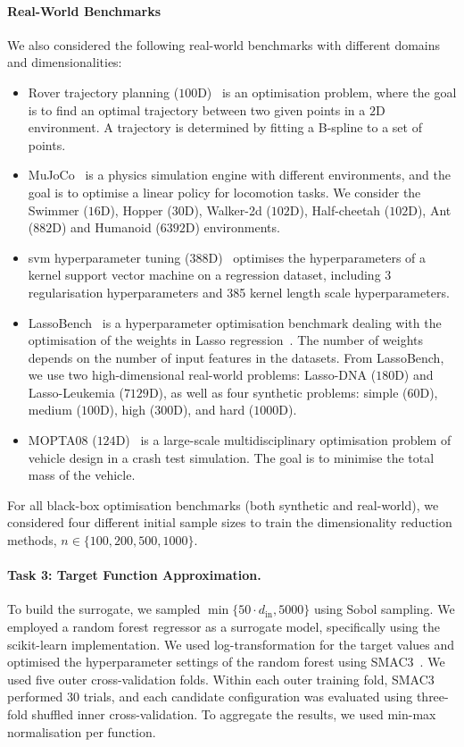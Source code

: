 \paragraph*{Real-World Benchmarks}
We also considered the following real-world benchmarks with different domains and dimensionalities:
\begin{itemize}
    \item Rover trajectory planning ($100\mathrm{D}$)~\citep{WanEtAl18} is an optimisation problem, where the goal is to find an optimal trajectory between two given points in a $2\mathrm{D}$ environment. A trajectory is determined by fitting a B-spline to a set of points.
    \item MuJoCo~\citep{ManEtAl18,TodEtAl12} is a physics simulation engine with different environments, and the goal is to optimise a linear policy for locomotion tasks. We consider the Swimmer ($16\mathrm{D}$), Hopper ($30\mathrm{D}$), Walker-2d ($102\mathrm{D}$), Half-cheetah ($102\mathrm{D}$), Ant ($882\mathrm{D}$) and Humanoid ($6392\mathrm{D}$) environments.
    \item \gls{svm} hyperparameter tuning ($388\mathrm{D}$)~\citep{EriJan21} optimises the hyperparameters of a kernel support vector machine on a regression dataset, including 3 regularisation hyperparameters and 385 kernel length scale hyperparameters.
    \item LassoBench~\citep{SehEtAl22} is a hyperparameter optimisation benchmark dealing with the optimisation of the weights in Lasso regression~\cite{GasEtAl09}. The number of weights depends on the number of input features in the datasets. From LassoBench, we use two high-dimensional real-world problems: Lasso-DNA ($180\mathrm{D}$) and Lasso-Leukemia ($7129\mathrm{D}$), as well as four synthetic problems: simple ($60\mathrm{D}$), medium ($100\mathrm{D}$), high ($300\mathrm{D}$), and hard ($1000\mathrm{D}$).
    \item MOPTA08 ($124\mathrm{D}$)~\citep{Jones08,EriJan21} is a large-scale multidisciplinary optimisation problem of vehicle design in a crash test simulation. The goal is to minimise the total mass of the vehicle.
\end{itemize}

For all black-box optimisation benchmarks (both synthetic and real-world), we considered four different initial sample sizes to train the dimensionality reduction methods, $n \in \{100,200,500,1000 \}$.
\paragraph*{Task 3: Target Function Approximation.}
To build the surrogate, we sampled $\min\{50 \cdot d_{\mathrm{in}}, 5000\}$ using Sobol sampling.
We employed a random forest regressor as a surrogate model, specifically using the scikit-learn implementation.
We used log-transformation for the target values and optimised
the hyperparameter settings of the random forest using SMAC3~\citep{LinEtAl22b}.
We used five outer cross-validation folds. Within each outer training fold, SMAC3 performed 30 trials, and each candidate configuration was evaluated using three-fold shuffled inner cross-validation.
To aggregate the results, we used min-max normalisation per function.

